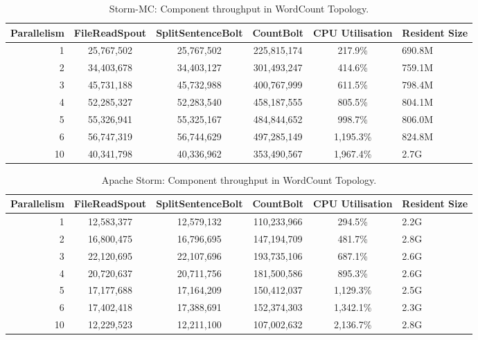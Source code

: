 \documentclass[bsc,logo,frontabs,twoside,singlespacing,normalheadings,parskip]{infthesis}\usepackage[]{graphicx}\usepackage[]{color}
\begin{document}
\begin{table}[!htb]
\begin{adjustwidth}{-0.5in}{-0.5in}
\centering
\small
\begin{tabular}{@{}rccccl@{}}
    \textbf{Parallelism} & \textbf{FileReadSpout} & \textbf{SplitSentenceBolt} & \textbf{CountBolt} & \textbf{CPU Utilisation} & \textbf{Resident Size} \\ \toprule
    1 & {25,767,502} & {25,767,502} & {225,815,174} & {217.9\%} & {690.8M} \\
    2 & {34,403,678} & {34,403,127} & {301,493,247} & {414.6\%} & {759.1M} \\
    3 & {45,731,188} & {45,732,988} & {400,767,999} & {611.5\%} & {798.4M} \\
    4 & {52,285,327} & {52,283,540} & {458,187,555} & {805.5\%} & {804.1M} \\
	5 & {55,326,941} & {55,325,167} & {484,844,652} & {998.7\%} & {806.0M} \\
	6 & {56,747,319} & {56,744,629} & {497,285,149} & {1,195.3\%} & {824.8M} \\
	10 & {40,341,798} & {40,336,962} & {353,490,567} & {1,967.4\%} & {2.7G} \\
\end{tabular}
\caption{Storm-MC: Component throughput in WordCount Topology.}
\label{table:storm_mc_wordcount}
\end{adjustwidth}
\end{table}

\begin{table}[!htb]
\begin{adjustwidth}{-0.5in}{-0.5in}
\centering
\small
\begin{tabular}{@{}rccccl@{}}
    \textbf{Parallelism} & \textbf{FileReadSpout} & \textbf{SplitSentenceBolt} & \textbf{CountBolt} & \textbf{CPU Utilisation} & \textbf{Resident Size} \\ \toprule
    1 & {12,583,377} & {12,579,132} & {110,233,966} & {294.5\%} & {2.2G} \\
    2 & {16,800,475} & {16,796,695} & {147,194,709} & {481.7\%} & {2.8G} \\
    3 & {22,120,695} & {22,107,696} & {193,735,106} & {687.1\%} & {2.6G} \\
    4 & {20,720,637} & {20,711,756} & {181,500,586} & {895.3\%} & {2.6G} \\
	5 & {17,177,688} & {17,164,209} & {150,412,037} & {1,129.3\%} & {2.5G} \\
	6 & {17,402,418} & {17,388,691} & {152,374,303} & {1,342.1\%} & {2.3G} \\
	10 & {12,229,523} & {12,211,100} & {107,002,632} & {2,136.7\%} & {2.8G} \\
\end{tabular}
\caption{Apache Storm: Component throughput in WordCount Topology.}
\label{table:storm_wordcount}
\end{adjustwidth}
\end{table}
\end{document}
